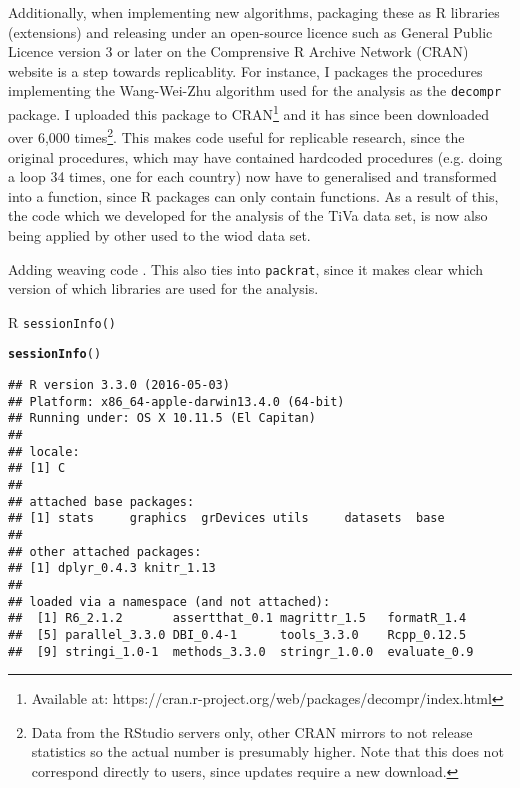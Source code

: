 \documentclass[a4paper,oneside,british]{book}\usepackage[]{graphicx}\usepackage[]{color}
\makeatletter
\newcommand{\hlstd}[1]{\textcolor[rgb]{0.345,0.345,0.345}{#1}}%
\newcommand{\hlkwd}[1]{\textcolor[rgb]{0.737,0.353,0.396}{\textbf{#1}}}%
\newenvironment{kframe}{%
 \def\at@end@of@kframe{}%
 \ifinner\ifhmode%
  \def\at@end@of@kframe{\end{minipage}}%
  \begin{minipage}{\columnwidth}%
 \fi\fi%
 \def\FrameCommand##1{\hskip\@totalleftmargin \hskip-\fboxsep
 \colorbox{shadecolor}{##1}\hskip-\fboxsep
     \hskip-\linewidth \hskip-\@totalleftmargin \hskip\columnwidth}%
 \MakeFramed {\advance\hsize-\width
   \@totalleftmargin\z@ \linewidth\hsize
   \@setminipage}}%
 {\par\unskip\endMakeFramed%
 \at@end@of@kframe}
\newenvironment{knitrout}{}{} %
\newcommand{\code}[1]{\texttt{#1}}
\makeatother
\begin{document}
Additionally, when implementing new algorithms, packaging these as
R libraries (extensions) and releasing under an open-source licence
such as General Public Licence version 3 or later on the Comprensive
R Archive Network (CRAN) website is a step towards replicablity. For
instance, I packages the procedures implementing the Wang-Wei-Zhu
algorithm used for the analysis as the \code{decompr} package. I
uploaded this package to CRAN\footnote{Available at: https://cran.r-project.org/web/packages/decompr/index.html}
and it has since been downloaded over 6,000 times\footnote{Data from the RStudio servers only, other CRAN mirrors to not release
statistics so the actual number is presumably higher. Note that this
does not correspond directly to users, since updates require a new
download.}. This makes code useful for replicable research, since the original
procedures, which may have contained hardcoded procedures (e.g. doing
a loop 34 times, one for each country) now have to generalised and
transformed into a function, since R packages can only contain functions.
As a result of this, the code which we developed for the analysis
of the TiVa  data set, is now also being applied by other used to
the wiod data set.

Adding weaving code . This also ties into \code{packrat}, since
it makes clear which version of which libraries are used for the analysis.

\begin{table}[H]
\caption{R \protect\code{sessionInfo()}}

\begin{knitrout}
\color{fgcolor}\begin{kframe}
\begin{alltt}
\hlkwd{sessionInfo}\hlstd{()}
\end{alltt}
\begin{verbatim}
## R version 3.3.0 (2016-05-03)
## Platform: x86_64-apple-darwin13.4.0 (64-bit)
## Running under: OS X 10.11.5 (El Capitan)
## 
## locale:
## [1] C
## 
## attached base packages:
## [1] stats     graphics  grDevices utils     datasets  base     
## 
## other attached packages:
## [1] dplyr_0.4.3 knitr_1.13 
## 
## loaded via a namespace (and not attached):
##  [1] R6_2.1.2       assertthat_0.1 magrittr_1.5   formatR_1.4   
##  [5] parallel_3.3.0 DBI_0.4-1      tools_3.3.0    Rcpp_0.12.5   
##  [9] stringi_1.0-1  methods_3.3.0  stringr_1.0.0  evaluate_0.9
\end{verbatim}
\end{kframe}
\end{knitrout}
\end{table}
\end{document}
